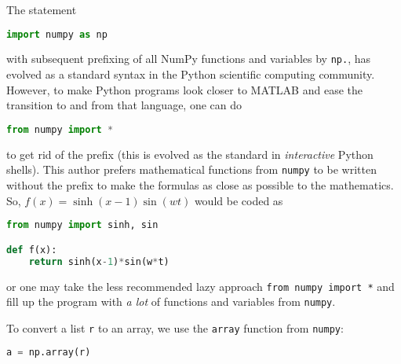 \documentclass[graybox,sectrefs,envcountresetchap,open=right,final]{svmonodo}
\newenvironment{notice_mdfboxadmon}[1][]{
\begin{notice_mdfboxmdframed}[frametitle=#1]
}
{
\end{notice_mdfboxmdframed}
}
\begin{document}
\begin{notice_mdfboxadmon}
The statement



\begin{lstlisting}[language=python,style=simple,xleftmargin=2mm]
import numpy as np

\end{lstlisting}

with subsequent prefixing of all NumPy functions and variables by \texttt{np.},
has evolved as a standard syntax in the Python scientific computing
community. However, to make Python programs look closer to MATLAB
and ease the transition to and from that language, one can do



\begin{lstlisting}[language=python,style=simple,xleftmargin=2mm]
from numpy import *

\end{lstlisting}

to get rid of the prefix (this is evolved as the standard in
\emph{interactive} Python shells). This author prefers mathematical
functions from \texttt{numpy} to be written without the prefix to
make the formulas as close as possible to the mathematics.
So, $f(x)=\sinh(x-1)\sin(w t)$ would be coded as






\begin{lstlisting}[language=python,style=simple,xleftmargin=2mm]
from numpy import sinh, sin

def f(x):
    return sinh(x-1)*sin(w*t)

\end{lstlisting}

or one may take the less recommended
lazy approach \texttt{from numpy import *} and fill up
the program with \emph{a lot} of functions and variables from \texttt{numpy}.
\end{notice_mdfboxadmon} %



To convert a list \texttt{r} to an array,
we use the \texttt{array} function
from \texttt{numpy}:



\begin{lstlisting}[language=python,style=simple,xleftmargin=2mm]
a = np.array(r)

\end{lstlisting}
\end{document}
